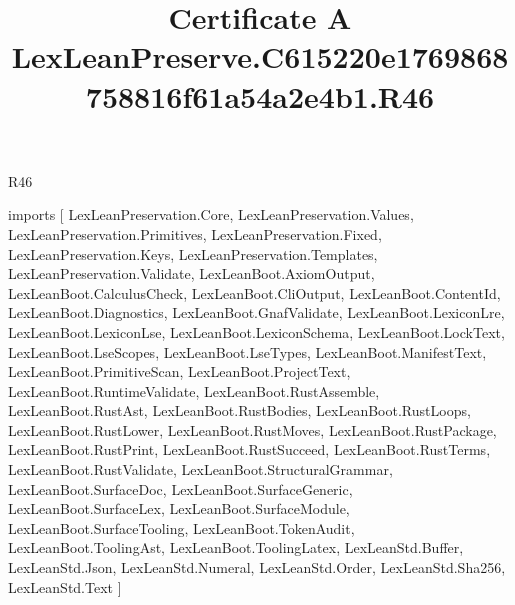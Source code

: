 \begin{lexlean}{R46}
\title{Certificate A LexLeanPreserve.C615220e1769868758816f61a54a2e4b1.R46}
\begin{coremodule}
imports [
  LexLeanPreservation.Core,
  LexLeanPreservation.Values,
  LexLeanPreservation.Primitives,
  LexLeanPreservation.Fixed,
  LexLeanPreservation.Keys,
  LexLeanPreservation.Templates,
  LexLeanPreservation.Validate,
  LexLeanBoot.AxiomOutput,
  LexLeanBoot.CalculusCheck,
  LexLeanBoot.CliOutput,
  LexLeanBoot.ContentId,
  LexLeanBoot.Diagnostics,
  LexLeanBoot.GnafValidate,
  LexLeanBoot.LexiconLre,
  LexLeanBoot.LexiconLse,
  LexLeanBoot.LexiconSchema,
  LexLeanBoot.LockText,
  LexLeanBoot.LseScopes,
  LexLeanBoot.LseTypes,
  LexLeanBoot.ManifestText,
  LexLeanBoot.PrimitiveScan,
  LexLeanBoot.ProjectText,
  LexLeanBoot.RuntimeValidate,
  LexLeanBoot.RustAssemble,
  LexLeanBoot.RustAst,
  LexLeanBoot.RustBodies,
  LexLeanBoot.RustLoops,
  LexLeanBoot.RustLower,
  LexLeanBoot.RustMoves,
  LexLeanBoot.RustPackage,
  LexLeanBoot.RustPrint,
  LexLeanBoot.RustSucceed,
  LexLeanBoot.RustTerms,
  LexLeanBoot.RustValidate,
  LexLeanBoot.StructuralGrammar,
  LexLeanBoot.SurfaceDoc,
  LexLeanBoot.SurfaceGeneric,
  LexLeanBoot.SurfaceLex,
  LexLeanBoot.SurfaceModule,
  LexLeanBoot.SurfaceTooling,
  LexLeanBoot.TokenAudit,
  LexLeanBoot.ToolingAst,
  LexLeanBoot.ToolingLatex,
  LexLeanStd.Buffer,
  LexLeanStd.Json,
  LexLeanStd.Numeral,
  LexLeanStd.Order,
  LexLeanStd.Sha256,
  LexLeanStd.Text
]


\end{coremodule}
\end{lexlean}
